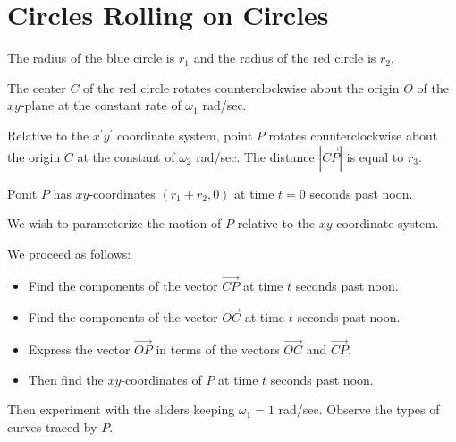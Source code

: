 \documentclass{ximera}
\begin{document}
\section{Circles Rolling on Circles}

\begin{exploration}  \label{Edst4hnt}
The radius of the blue circle is $r_1$ and the radius of the red circle is $r_2$.
 
The center $C$ of the red circle rotates counterclockwise about the origin $O$ of the $xy$-plane at the constant rate of $\omega_1$ rad/sec.

Relative to the $x^\prime y^\prime$ coordinate system, point $P$ rotates counterclockwise about the origin $C$ at the constant
of $\omega_2$ rad/sec. The distance $|\overrightarrow{CP}|$ is equal to $r_3$.

Ponit $P$ has $xy$-coordinates $(r_1 + r_2 , 0)$ at time $t=0$ seconds past noon.

We wish to parameterize the motion of $P$ relative to the $xy$-coordinate system.

We proceed as follows:

\begin{itemize}

\item{Find the components of the vector $\overrightarrow{CP}$ at time $t$ seconds past noon.}

\item{Find the components of the vector $\overrightarrow{OC}$ at time $t$ seconds past noon.}


\item{Express the vector $\overrightarrow{OP}$ in terms of the vectors $\overrightarrow{OC}$ and $\overrightarrow{CP}$.}



\item{Then find the $xy$-coordinates of $P$ at time $t$ seconds past noon.}

\end{itemize}

Then experiment with the sliders keeping $\omega_1 = 1$ rad/sec. Observe the types of curves traced by $P$.


\end{exploration}
\end{document}
